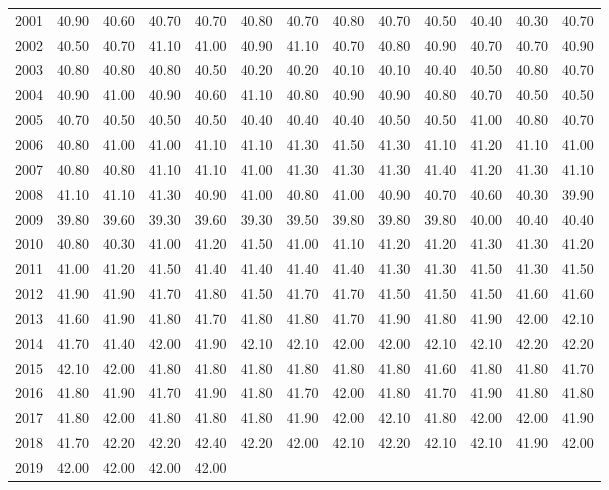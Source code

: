 \begin{longtable}{rrrrrrrrrrrrr}
  2001 & 40.90 & 40.60 & 40.70 & 40.70 & 40.80 & 40.70 & 40.80 & 40.70 & 40.50 & 40.40 & 40.30 & 40.70 \\ 
  2002 & 40.50 & 40.70 & 41.10 & 41.00 & 40.90 & 41.10 & 40.70 & 40.80 & 40.90 & 40.70 & 40.70 & 40.90 \\ 
  2003 & 40.80 & 40.80 & 40.80 & 40.50 & 40.20 & 40.20 & 40.10 & 40.10 & 40.40 & 40.50 & 40.80 & 40.70 \\ 
  2004 & 40.90 & 41.00 & 40.90 & 40.60 & 41.10 & 40.80 & 40.90 & 40.90 & 40.80 & 40.70 & 40.50 & 40.50 \\ 
  2005 & 40.70 & 40.50 & 40.50 & 40.50 & 40.40 & 40.40 & 40.40 & 40.50 & 40.50 & 41.00 & 40.80 & 40.70 \\ 
  2006 & 40.80 & 41.00 & 41.00 & 41.10 & 41.10 & 41.30 & 41.50 & 41.30 & 41.10 & 41.20 & 41.10 & 41.00 \\ 
  2007 & 40.80 & 40.80 & 41.10 & 41.10 & 41.00 & 41.30 & 41.30 & 41.30 & 41.40 & 41.20 & 41.30 & 41.10 \\ 
  2008 & 41.10 & 41.10 & 41.30 & 40.90 & 41.00 & 40.80 & 41.00 & 40.90 & 40.70 & 40.60 & 40.30 & 39.90 \\ 
  2009 & 39.80 & 39.60 & 39.30 & 39.60 & 39.30 & 39.50 & 39.80 & 39.80 & 39.80 & 40.00 & 40.40 & 40.40 \\ 
  2010 & 40.80 & 40.30 & 41.00 & 41.20 & 41.50 & 41.00 & 41.10 & 41.20 & 41.20 & 41.30 & 41.30 & 41.20 \\ 
  2011 & 41.00 & 41.20 & 41.50 & 41.40 & 41.40 & 41.40 & 41.40 & 41.30 & 41.30 & 41.50 & 41.30 & 41.50 \\ 
  2012 & 41.90 & 41.90 & 41.70 & 41.80 & 41.50 & 41.70 & 41.70 & 41.50 & 41.50 & 41.50 & 41.60 & 41.60 \\ 
  2013 & 41.60 & 41.90 & 41.80 & 41.70 & 41.80 & 41.80 & 41.70 & 41.90 & 41.80 & 41.90 & 42.00 & 42.10 \\ 
  2014 & 41.70 & 41.40 & 42.00 & 41.90 & 42.10 & 42.10 & 42.00 & 42.00 & 42.10 & 42.10 & 42.20 & 42.20 \\ 
  2015 & 42.10 & 42.00 & 41.80 & 41.80 & 41.80 & 41.80 & 41.80 & 41.80 & 41.60 & 41.80 & 41.80 & 41.70 \\ 
  2016 & 41.80 & 41.90 & 41.70 & 41.90 & 41.80 & 41.70 & 42.00 & 41.80 & 41.70 & 41.90 & 41.80 & 41.80 \\ 
  2017 & 41.80 & 42.00 & 41.80 & 41.80 & 41.80 & 41.90 & 42.00 & 42.10 & 41.80 & 42.00 & 42.00 & 41.90 \\ 
  2018 & 41.70 & 42.20 & 42.20 & 42.40 & 42.20 & 42.00 & 42.10 & 42.20 & 42.10 & 42.10 & 41.90 & 42.00 \\ 
  2019 & 42.00 & 42.00 & 42.00 & 42.00 &  &  &  &  &  &  &  &  \\ 
   \hline
\hline
\end{longtable}
